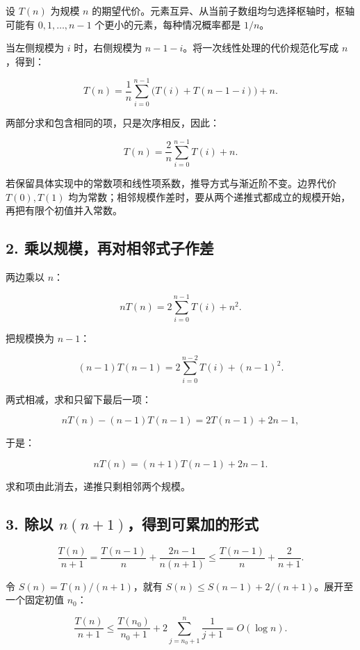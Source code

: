 \documentclass[
  UTF8,fontset=none,zihao=5]{ctexart}
\let\OldSubsection\subsection
\renewcommand{\subsection}{\Needspace{4\baselineskip}\OldSubsection}
\begin{document}
设 \(T(n)\) 为规模 \(n\)
的期望代价。元素互异、从当前子数组均匀选择枢轴时，枢轴可能有
\(0,1,\ldots,n-1\) 个更小的元素，每种情况概率都是 \(1/n\)。

当左侧规模为 \(i\) 时，右侧规模为
\(n-1-i\)。将一次线性处理的代价规范化写成 \(n\)，得到：

\[
T(n)=\frac1n\sum_{i=0}^{n-1}
\bigl(T(i)+T(n-1-i)\bigr)+n.
\]

两部分求和包含相同的项，只是次序相反，因此：

\[
T(n)=\frac2n\sum_{i=0}^{n-1}T(i)+n.
\]

若保留具体实现中的常数项和线性项系数，推导方式与渐近阶不变。边界代价
\(T(0),T(1)\)
均为常数；相邻规模作差时，要从两个递推式都成立的规模开始，再把有限个初值并入常数。

\hypertarget{ux4e58ux4ee5ux89c4ux6a21ux518dux5bf9ux76f8ux90bbux5f0fux5b50ux4f5cux5dee}{%
\subsection{2.
乘以规模，再对相邻式子作差}\label{ux4e58ux4ee5ux89c4ux6a21ux518dux5bf9ux76f8ux90bbux5f0fux5b50ux4f5cux5dee}}

两边乘以 \(n\)：

\[
nT(n)=2\sum_{i=0}^{n-1}T(i)+n^2.
\]

把规模换为 \(n-1\)：

\[
(n-1)T(n-1)=2\sum_{i=0}^{n-2}T(i)+(n-1)^2.
\]

两式相减，求和只留下最后一项：

\[
nT(n)-(n-1)T(n-1)=2T(n-1)+2n-1,
\]

于是：

\[
nT(n)=(n+1)T(n-1)+2n-1.
\]

求和项由此消去，递推只剩相邻两个规模。

\hypertarget{ux9664ux4ee5-nn1ux5f97ux5230ux53efux7d2fux52a0ux7684ux5f62ux5f0f}{%
\subsection{\texorpdfstring{3. 除以
\(n(n+1)\)，得到可累加的形式}{3. 除以 n(n+1)，得到可累加的形式}}\label{ux9664ux4ee5-nn1ux5f97ux5230ux53efux7d2fux52a0ux7684ux5f62ux5f0f}}

\[
\frac{T(n)}{n+1}
=\frac{T(n-1)}n+\frac{2n-1}{n(n+1)}
\le\frac{T(n-1)}n+\frac2{n+1}.
\]

令 \(S(n)=T(n)/(n+1)\)，就有
\(S(n)\le S(n-1)+2/(n+1)\)。展开至一个固定初值 \(n_0\)：

\[
\frac{T(n)}{n+1}
\le \frac{T(n_0)}{n_0+1}
+2\sum_{j=n_0+1}^{n}\frac1{j+1}
=O(\log n).
\]
\end{document}

